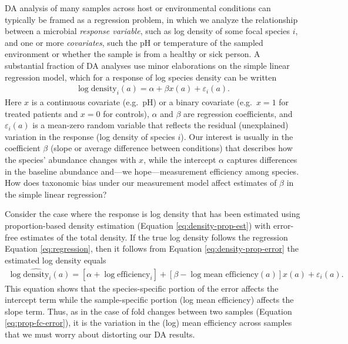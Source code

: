 \documentclass[
]{article}
\theoremstyle{definition}
\theoremstyle{definition}
\theoremstyle{definition}
\theoremstyle{definition}
\theoremstyle{remark}
\begin{document}
DA analysis of many samples across host or environmental conditions can typically be framed as a regression problem, in which we analyze the relationship between a microbial \emph{response variable}, such as log density of some focal species \(i\), and one or more \emph{covariates}, such the pH or temperature of the sampled environment or whether the sample is from a healthy or sick person.
A substantial fraction of DA analyses use minor elaborations on the simple linear regression model, which for a response of log species density can be written
\begin{align}
  \label{eq:regression}
  \log \text{density}_i(a) = \alpha + \beta x(a) + \varepsilon_i(a).
\end{align}
Here \(x\) is a continuous covariate (e.g.~pH) or a binary covariate (e.g.~\(x=1\) for treated patients and \(x=0\) for controls), \(\alpha\) and \(\beta\) are regression coefficients, and \(\varepsilon_i(a)\) is a mean-zero random variable that reflects the residual (unexplained) variation in the response (log density of species \(i\)).
Our interest is usually in the coefficient \(\beta\) (slope or average difference between conditions) that describes how the species' abundance changes with \(x\), while the intercept \(\alpha\) captures differences in the baseline abundance and---we hope---measurement efficiency among species.
How does taxonomic bias under our measurement model affect estimates of \(\beta\) in the simple linear regression?

Consider the case where the response is log density that has been estimated using proportion-based density estimation (Equation \eqref{eq:density-prop-est}) with error-free estimates of the total density.
If the true log density follows the regression Equation \eqref{eq:regression}, then it follows from Equation \eqref{eq:density-prop-error} the estimated log density equals
\begin{align}
  \label{eq:regression-error}
  \log \hat{\text{density}}_i(a)
  = [\alpha + \log \text{efficiency}_i] + [\beta - \log \text{mean efficiency}(a)] x(a) + \varepsilon_i(a).
\end{align}
This equation shows that the species-specific portion of the error affects the intercept term while the sample-specific portion (log mean efficiency) affects the slope term.
Thus, as in the case of fold changes between two samples (Equation \eqref{eq:prop-fc-error}), it is the variation in the (log) mean efficiency across samples that we must worry about distorting our DA results.
\end{document}
